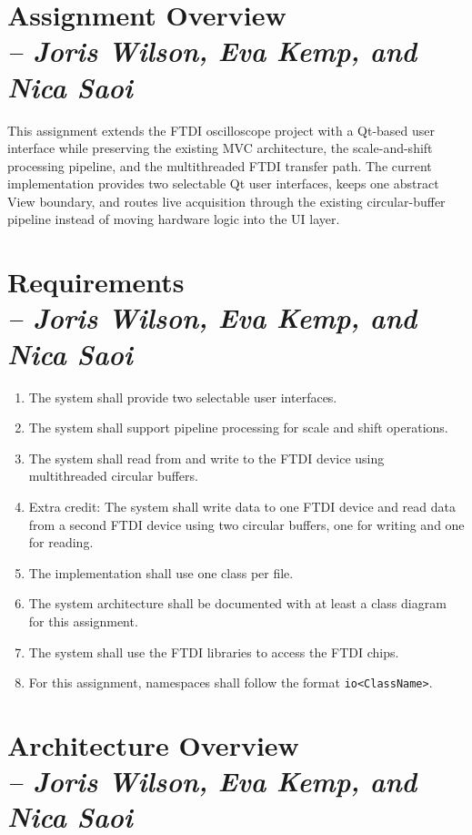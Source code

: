     \section{Assignment Overview \\
    \small{\textit{-- Joris Wilson, Eva Kemp, and Nica Saoi}}}
    \label{Section::Assignment Overview}

    This assignment extends the FTDI oscilloscope project with a Qt-based user interface while preserving the existing MVC architecture, the scale-and-shift processing pipeline, and the multithreaded FTDI transfer path. The current implementation provides two selectable Qt user interfaces, keeps one abstract View boundary, and routes live acquisition through the existing circular-buffer pipeline instead of moving hardware logic into the UI layer.

    \section{Requirements \\
    \small{\textit{-- Joris Wilson, Eva Kemp, and Nica Saoi}}}
    \label{Section::Requirements}

    \begin{enumerate}
        \item The system shall provide two selectable user interfaces.
        \item The system shall support pipeline processing for scale and shift operations.
        \item The system shall read from and write to the FTDI device using multithreaded circular buffers.
        \item Extra credit: The system shall write data to one FTDI device and read data from a second FTDI device using two circular buffers, one for writing and one for reading.
        \item The implementation shall use one class per file.
        \item The system architecture shall be documented with at least a class diagram for this assignment.
        \item The system shall use the FTDI libraries to access the FTDI chips.
        \item For this assignment, namespaces shall follow the format \texttt{io<ClassName>}.
    \end{enumerate}

    \section{Architecture Overview \\
    \small{\textit{-- Joris Wilson, Eva Kemp, and Nica Saoi}}}
    \label{Section::Architecture Overview}

